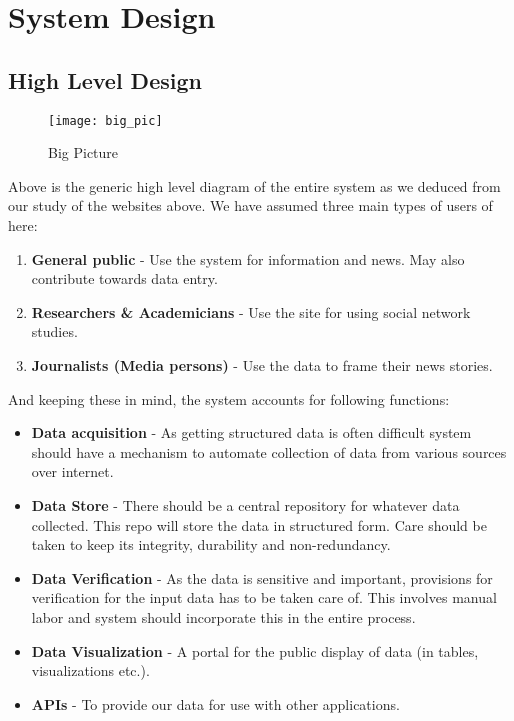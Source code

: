 \chapter{System Design}


\section{High Level Design}

\begin{figure}[here]
\begin{center}	
\texttt{[image: big\_pic]} 
\caption{Big Picture}
\label{fig:big_pic}
\end{center}
\end{figure}

Above is the generic high level diagram of the entire system as we deduced from our study of the websites above.
We have assumed three main types of users of here:
\begin{enumerate}
\item\textbf{General public} - Use the system for information and news. May also contribute towards data entry.
\item\textbf{Researchers \& Academicians} - Use the site for using social network studies.
\item\textbf{Journalists (Media persons)} - Use the data to frame their news stories.
\end{enumerate}


And keeping these in mind, the system accounts for following functions:
\begin{itemize}
\item\textbf{Data acquisition} - As getting structured data is often difficult system should have a mechanism to automate collection of data from various sources over internet.
\item\textbf{Data Store}  - There should be a central repository for whatever data collected. This repo will store the data in structured form. Care should be taken to keep its integrity, durability and non-redundancy.
\item\textbf{Data Verification} - As the data is sensitive and important, provisions for verification for the input data has to be taken care of. This involves manual labor and system should incorporate this in the entire process.
\item\textbf{Data Visualization} - A portal for the public display of data (in tables, visualizations etc.).
\item\textbf{APIs} - To provide our data for use with other applications.
\end{itemize}

